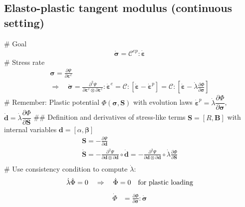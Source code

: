 \documentclass[]{scrartcl}
\begin{document}
\subsection{Elasto-plastic tangent modulus (continuous setting)}
\begin{easylist}
# Goal
\begin{gather*}
\dot{\boldsymbol{\sigma}} 
  = \boldsymbol{\mathcal{C}}^{ep} : \dot{\boldsymbol{\varepsilon}}
\end{gather*}
# Stress rate
\begin{gather*}
\boldsymbol{\sigma}
  = \frac{\partial \Psi}{\partial \boldsymbol{\varepsilon}^{e}} \\
\Rightarrow \quad
\dot{\boldsymbol{\sigma}}
  = \frac{\partial^{2} \Psi}{\partial \boldsymbol{\varepsilon}^{e} \otimes \partial \boldsymbol{\varepsilon}^{e}} : \dot{\boldsymbol{\varepsilon}}^{e}
  = \boldsymbol{\mathcal{C}} : \left[ \dot{\boldsymbol{\varepsilon}} - \dot{\boldsymbol{\varepsilon}}^{p} \right]
  = \boldsymbol{\mathcal{C}} : \left[ \dot{\boldsymbol{\varepsilon}} - \dot{\lambda} \frac{\partial \Phi}{\partial \boldsymbol{\sigma}} \right]
\end{gather*}
# Remember: Plastic potential $\Phi \left( \boldsymbol{\sigma},\boldsymbol{S} \right)$ with evolution laws
$
\dot{\boldsymbol{\varepsilon}}^{p} 
  = \dot{\lambda} \dfrac{\partial \Phi}{\partial \boldsymbol{\sigma}}
$, $
\dot{\boldsymbol{d}} 
  = \dot{\lambda} \dfrac{\partial \Phi}{\partial \boldsymbol{S}}
$
## Definition and derivatives of stress-like terms $\boldsymbol{S} = \left[ R,\boldsymbol{B} \right]$ with internal variables $\boldsymbol{d} = \left[ \alpha,\boldsymbol{\beta} \right]$
\begin{gather*}
\boldsymbol{S} 
  = - \frac{\partial \Psi}{\partial \boldsymbol{d}} \\
\dot{\boldsymbol{S}} 
  = - \frac{\partial^{2} \Psi}{\partial \boldsymbol{d} \otimes \partial \boldsymbol{d}} \circ \dot{\boldsymbol{d}}
  =  - \frac{\partial^{2} \Psi}{\partial \boldsymbol{d} \otimes \partial \boldsymbol{d}} \circ \dot{\lambda} \frac{\partial \Phi}{\partial \boldsymbol{S}} \\
\end{gather*}
# Use consistency condition to compute $\dot{\lambda}$:
\begin{gather*}
\dot{\lambda} \dot{\Phi} = 0 
\quad \Rightarrow  \quad
\dot{\Phi} = 0 \quad \textnormal{for plastic loading}
\end{gather*}
\begin{align*}
\dot{\Phi}
 &= \frac{\partial \Phi}{\partial \boldsymbol{\sigma}} : \dot{\boldsymbol{\sigma}}

\end{align*}
\end{easylist}
\end{document}

